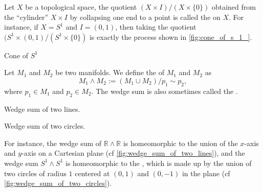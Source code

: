 \documentclass[notoc,notitlepage]{tufte-book}
\begin{document}
\begin{eg}
  Let $X$ be a topological space, the quotient $(X \times I) / (X \times \{ 0 \})$ obtained from
  the ``cylinder'' $X \times I$ by collapsing one end to a point is called the  on
  $X$. For instance, if $X = S^1$ and $I = (0, 1)$, then taking the quotient
  $(S^1 \times (0, 1)/(S^1 \times \{ 0 \})$ is exactly the process shown in
  \cref{fig:cone_of_s_1_}.
  \begin{marginfigure}
    \centering
    \caption{Cone of $S^1$}\label{fig:cone_of_s_1_}
  \end{marginfigure}
\end{eg}

\begin{eg}\label{eg:wedge_sum_of_manifolds}
  Let $M_1$ and $M_2$ be two manifolds. We define the  of $M_1$ and $M_2$ as
  \begin{equation*}
    M_1 \wedge M_2 := (M_1 \cup M_2) / p_1 \sim p_2,
  \end{equation*}
  where $p_1 \in M_1$ and $p_2 \in M_2$. The wedge sum is also sometimes called the
  .
  \begin{marginfigure}
    \centering
    \caption{Wedge sum of two lines.}\label{fig:wedge_sum_of_two_lines}
  \end{marginfigure}
  \begin{marginfigure}
    \centering
    \caption{Wedge sum of two circles.}\label{fig:wedge_sum_of_two_circles}
  \end{marginfigure}
  For instance, the wedge sum of $\mathbb{R} \wedge \mathbb{R}$ is homeomorphic to the union
  of the $x$-axis and $y$-axis on a Cartesian plane (cf \cref{fig:wedge_sum_of_two_lines}),
  and the wedge sum $S^1 \wedge S^1$ is homeomorphic to the ,
  which is made up by the union of two circles of radius $1$ centered at $(0, 1)$ and $(0, -1)$
  in the plane (cf \cref{fig:wedge_sum_of_two_circles}).
\end{eg}
\end{document}
